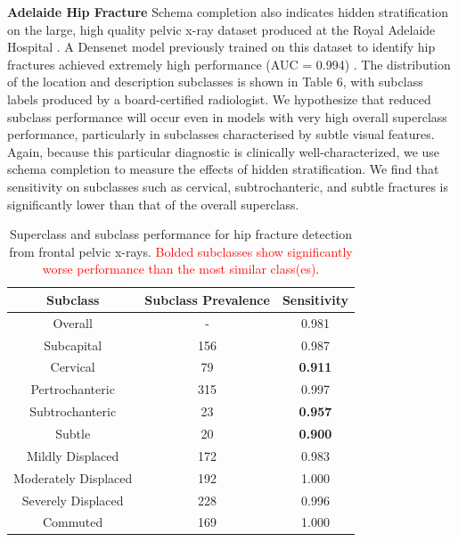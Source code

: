 \documentclass{article}
\begin{document}
\textbf{Adelaide Hip Fracture} Schema completion also indicates hidden stratification on the large, high quality pelvic x-ray dataset produced at the Royal Adelaide Hospital \citep{Gale_W_Oakden-Rayner_L_Carneiro_G_Bradley_AP_Palmer_LJ2017-tl}.
 A Densenet model previously trained on this dataset to identify hip fractures achieved extremely high performance (AUC = 0.994) \citep{Gale_W_Oakden-Rayner_L_Carneiro_G_Bradley_AP_Palmer_LJ2017-tl}. 
 The distribution of the location and description subclasses is shown in Table 6, with subclass labels produced by a board-certified radiologist.  
 We hypothesize that reduced subclass performance will occur even in models with very high overall superclass performance, particularly in subclasses characterised by subtle visual features.  
 Again, because this particular diagnostic is clinically well-characterized, we use schema completion to measure the effects of hidden stratification.  
 We find that sensitivity on subclasses such as cervical, subtrochanteric, and subtle fractures is significantly lower than that of the overall superclass.  
 
\begin{table}[htb!]
\centering
\begin{tabular}{|c|c|c|}
\hline
 Subclass & Subclass Prevalence & Sensitivity \\
 \hline
 Overall & - & 0.981  \\
 Subcapital & 156 & 0.987   \\
 Cervical & 79 & \textbf{0.911}\\
 Pertrochanteric & 315  & 0.997\\
 Subtrochanteric & 23 & \textbf{0.957} \\
 Subtle & 20 & \textbf{0.900}\\
 Mildly Displaced & 172 & 0.983\\
 Moderately Displaced & 192 & 1.000\\
 Severely Displaced & 228 & 0.996\\
 Commuted & 169 & 1.000 \\ 
 \hline
\end{tabular}
\caption{Superclass and subclass performance for hip fracture detection from frontal pelvic x-rays. \textcolor{red}{Bolded subclasses show significantly worse performance than the most similar class(es)}.}
\label{tab:hip1}
\vspace{-6mm}
\end{table}
\end{document}

